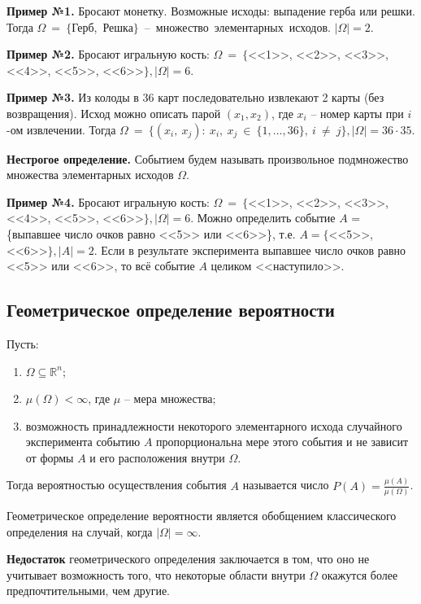 \textbf{Пример №1.} Бросают монетку. Возможные исходы: выпадение герба или решки. Тогда $\Omega~=~\{$Герб,~Решка$\}$~--~множество~элементарных~исходов. $|\Omega| = 2$.

\textbf{Пример №2.} Бросают игральную кость: $\Omega~=~\{$<<1>>, <<2>>, <<3>>, <<4>>, <<5>>, <<6>>$\}, |\Omega| = 6.$

\textbf{Пример №3.} Из колоды в 36 карт последовательно извлекают 2 карты (без возвращения). Исход можно описать парой $(x_1, x_2)$, где $x_i$ -- номер карты при $i$-ом извлечении. Тогда $\Omega~=~\{(x_i,~x_j):~x_i,~x_j~\in~\{1, ..., 36\},~i~\neq~j\}, |\Omega| = 36 \cdot 35.$ 

\textbf{Нестрогое определение.} Событием будем называть произвольное подмножество множества элементарных исходов $\Omega$.

\textbf{Пример №4.} Бросают игральную кость: $\Omega~=~\{$<<1>>, <<2>>, <<3>>, <<4>>, <<5>>, <<6>>$\}, |\Omega| = 6.$ Можно определить событие $A$ = \{выпавшее число очков равно <<5>> или <<6>>\}, т.е. $A = \{$<<5>>, <<6>>$\}, |A| = 2$. Если в результате эксперимента выпавшее число очков равно <<5>> или <<6>>, то всё событие $A$ целиком <<наступило>>.

\subsection*{Геометрическое определение вероятности}

Пусть:
\begin{enumerate}[label=\arabic*)]
	\item $\Omega \subseteq \mathbb{R}^n$;
	\item $\mu(\Omega) < \infty$, где $\mu$ -- мера множества;
	\item возможность принадлежности некоторого элементарного исхода случайного эксперимента событию $A$ пропорциональна мере этого события и не зависит от формы $A$ и его расположения внутри $\Omega$.
\end{enumerate}

Тогда вероятностью осуществления события $A$ называется число $P(A) = \frac{\mu(A)}{\mu(\Omega)}$.

Геометрическое определение вероятности является обобщением классического определения на случай, когда $|\Omega| = \infty$.

\textbf{Недостаток} геометрического определения заключается в том, что оно не учитывает возможность того, что некоторые области внутри $\Omega$ окажутся более предпочтительными, чем другие.

